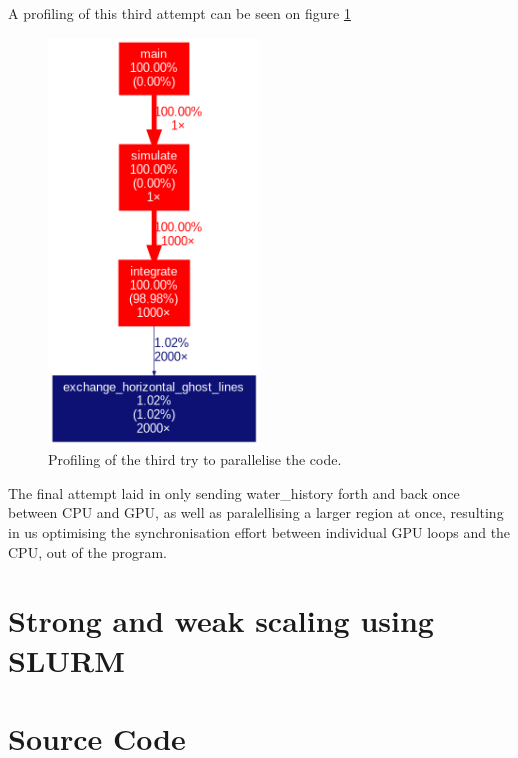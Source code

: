 \documentclass{article}
\begin{document}
A profiling of this third attempt can be seen on figure \ref{fig:profiling:thirdattempt}
\begin{figure}[h]
    \includegraphics[width=0.5\textwidth]{./figures/sequential_profile.png}
    \centering
    \caption{Profiling of the third try to parallelise the code. }
    \label{fig:profiling:thirdattempt}
\end{figure}

The final attempt laid in only sending water\_history forth and back once between CPU and GPU, as well as paralellising a larger region at once, resulting in us optimising the synchronisation effort between individual GPU loops and the CPU, out of the program. 

\section{Strong and weak scaling using SLURM}



\FloatBarrier
\section{Source Code}
\label{sec:source}

\end{document}
